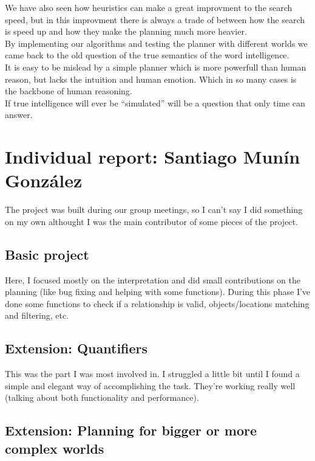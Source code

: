 \documentclass[11pt]{article}
\begin{document}
We have also seen how heuristics can make a great improvment to the search 
speed, but in this improvment there is always a trade of between how 
the search is speed up and how they make the planning much more heavier.  \\ 

By implementing our algorithms and testing the planner with different worlds 
we came back to the old question of the true semantics of the word 
intelligence. \\ 

It is easy to be mislead by a simple planner which is more powerfull 
than human reason, but lacks the intuition and human emotion. Which in so many 
cases is the backbone of human reasoning.    \\

If true intelligence will ever be ``simulated'' will be a question that only 
time can answer.  \\
\newpage
\appendix
\section{Individual report: Santiago Munín González}
The project was built during our group meetings, so I can't say I did something on my own althought I 
was the main contributor of some pieces of the project.

\subsection{Basic project}

Here, I focused mostly on the interpretation and did small contributions on the planning (like bug fixing and 
helping with some functions). During this phase I've done some functions to check if a relationship is valid, 
objects/locations matching and filtering, etc.

\subsection{Extension: Quantifiers}

This was the part I was most involved in. I struggled a little 
bit until I found a simple and elegant way of accomplishing the task. They're working really well (talking about both functionality and performance).

\subsection{Extension: Planning for bigger or more complex worlds}
\end{document}
